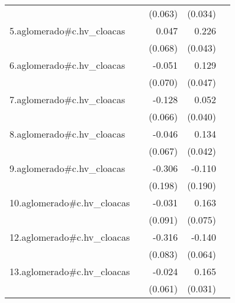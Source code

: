 {\begin{longtable}{l*{4}{D{.}{.}{-1}}}
            &                     &     (0.063)         &     (0.034)         &                     \\
\addlinespace
5.aglomerado#c.hv\_cloacas&                     &       0.047         &       0.226\sym{***}&                     \\
            &                     &     (0.068)         &     (0.043)         &                     \\
\addlinespace
6.aglomerado#c.hv\_cloacas&                     &      -0.051         &       0.129\sym{**} &                     \\
            &                     &     (0.070)         &     (0.047)         &                     \\
\addlinespace
7.aglomerado#c.hv\_cloacas&                     &      -0.128         &       0.052         &                     \\
            &                     &     (0.066)         &     (0.040)         &                     \\
\addlinespace
8.aglomerado#c.hv\_cloacas&                     &      -0.046         &       0.134\sym{**} &                     \\
            &                     &     (0.067)         &     (0.042)         &                     \\
\addlinespace
9.aglomerado#c.hv\_cloacas&                     &      -0.306         &      -0.110         &                     \\
            &                     &     (0.198)         &     (0.190)         &                     \\
\addlinespace
10.aglomerado#c.hv\_cloacas&                     &      -0.031         &       0.163\sym{*}  &                     \\
            &                     &     (0.091)         &     (0.075)         &                     \\
\addlinespace
12.aglomerado#c.hv\_cloacas&                     &      -0.316\sym{***}&      -0.140\sym{*}  &                     \\
            &                     &     (0.083)         &     (0.064)         &                     \\
\addlinespace
13.aglomerado#c.hv\_cloacas&                     &      -0.024         &       0.165\sym{***}&                     \\
            &                     &     (0.061)         &     (0.031)         &                     \\

\end{longtable}}
